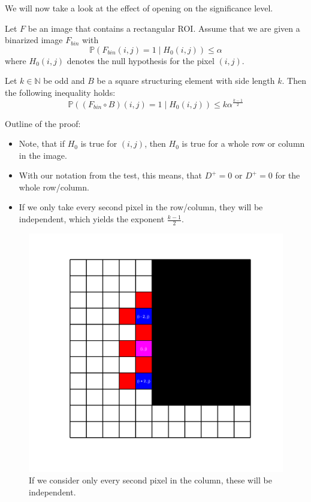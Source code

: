 \documentclass{beamer}
\begin{document}
\begin{frame}
	We will now take a look at the effect of opening on the significance level.
	
	\begin{theorem}
		Let $F$ be an image that contains a rectangular ROI. Assume that we are given a binarized image $F_{bin}$ with
		\begin{equation*}
			\mathbb{P}(F_{bin}(i, j) = 1 \mid H_0(i, j)) \leq \alpha
		\end{equation*}
		where $H_0(i, j)$ denotes the null hypothesis for the pixel $(i, j)$.
		
		Let $k \in \mathbb{N}$ be odd and $B$ be a square structuring element with side length $k$. Then the following inequality holds:
		\begin{equation*}
			\mathbb{P}((F_{bin} \circ B)(i, j) = 1 \mid H_0(i, j)) \leq k \alpha^\frac{k - 1}{2}
		\end{equation*}
	\end{theorem}
\end{frame}

\begin{frame}
	Outline of the proof:
	\begin{itemize}
		\item Note, that if $H_0$ is true for $(i, j)$, then $H_0$ is true for a whole row or column in the image.
		\item With our notation from the test, this means, that $D^+ = 0$ or $D^+ = 0$ for the whole row/column.
		\item If we only take every second pixel in the row/column, they will be independent, which yields the exponent $\frac{k - 1}{2}$.
	\end{itemize}
\end{frame}

\begin{frame}
	\begin{figure}[h]
		\includegraphics[width=0.6\linewidth]{Morphology/IndependentPoints}
		\caption[Independent points]{If we consider only every second pixel in the column, these will be independent.}
		\label{fig:IndependentPoints}
	\end{figure}
\end{frame}
\end{document}
